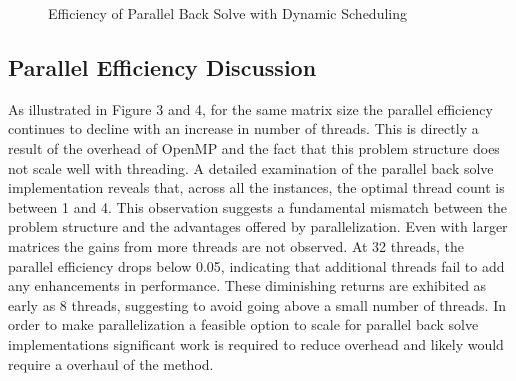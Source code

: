 \documentclass{article}
\begin{document}
\begin{figure}[htb!]
    \centering
    \caption{Efficiency of Parallel Back Solve with Dynamic Scheduling}
\end{figure}

\clearpage

\subsection{Parallel Efficiency Discussion}
As illustrated in Figure 3 and 4, for the same matrix size the parallel efficiency continues to decline with an increase in number of threads. This is directly a result of the overhead of OpenMP and the fact that this problem structure does not scale well with threading. A detailed examination of the parallel back solve implementation reveals that, across all the instances, the optimal thread count is between 1 and 4. This observation suggests a fundamental mismatch between the problem structure and the advantages offered by parallelization. Even with larger matrices the gains from more threads are not observed. At 32 threads, the parallel efficiency drops below 0.05, indicating that additional threads fail to add any enhancements in performance. These diminishing returns are exhibited as early as 8 threads, suggesting to avoid going above a small number of threads. In order to make parallelization a feasible option to scale for parallel back solve implementations significant work is required to reduce overhead and likely would require a overhaul of the method.  
\end{document}
